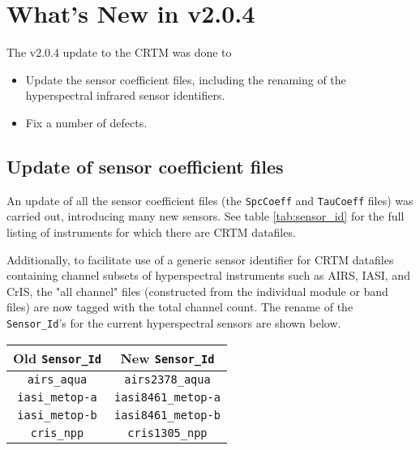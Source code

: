 \chapter*{What's New in v2.0.4}

The v2.0.4 update to the CRTM was done to
\begin{itemize}
  \item Update the sensor coefficient files, including the renaming of the hyperspectral infrared sensor identifiers.
  \item Fix a number of defects.
\end{itemize}


\section*{Update of sensor coefficient files}

An update of all the sensor coefficient files (the \texttt{SpcCoeff} and \texttt{TauCoeff} files) was carried out, introducing many new sensors. See table \ref{tab:sensor_id} for the full listing of instruments for which there are CRTM datafiles.

Additionally, to facilitate use of a generic sensor identifier for CRTM datafiles containing channel subsets of hyperspectral instruments such as AIRS, IASI, and CrIS, the "all channel" files (constructed from the individual module or band files) are now tagged with the total channel count. The rename of the \texttt{Sensor\_Id}'s for the current hyperspectral sensors are shown below.

\begin{center}
  \begin{tabular}{c c}
    \hline
    \sffamily\textbf{Old \texttt{Sensor\_Id}} & \sffamily\textbf{New \texttt{Sensor\_Id}} \\
    \hline\hline
    \texttt{airs\_aqua}    & \texttt{airs2378\_aqua}    \\
    \texttt{iasi\_metop-a} & \texttt{iasi8461\_metop-a} \\
    \texttt{iasi\_metop-b} & \texttt{iasi8461\_metop-b} \\
    \texttt{cris\_npp}     & \texttt{cris1305\_npp}     \\
    \hline 
  \end{tabular}
\end{center}



